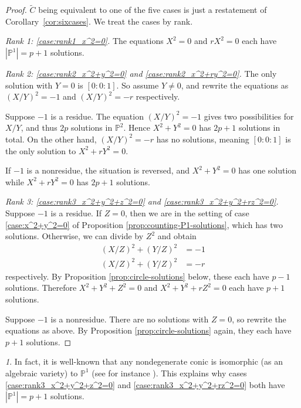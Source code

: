 \documentclass[10pt,a4paper]{amsart}
\numberwithin{equation}{section}
\numberwithin{figure}{section}
\numberwithin{table}{section}
\theoremstyle{definition}
\theoremstyle{plain}
\theoremstyle{remark}
\newtheorem*{rem*}{\protect\remarkname}
\theoremstyle{plain}
\theoremstyle{definition}
\theoremstyle{plain}
\theoremstyle{plain}
\providecommand{\remarkname}{Remark}
\renewcommand{\P}{\mathbb{P}}
\begin{document}
	\begin{proof}
		$\widetilde{C}$ being equivalent to one of the five cases is just a restatement of Corollary~\ref{cor:sixcases}. We treat the cases by rank.
		
		\noindent
		\textit{Rank 1: \eqref{case:rank1_x^2=0}.} 
		The equations $X^2 = 0$ and $rX^2 = 0$ each have $|\P^1|=p + 1$ solutions.
		
		\noindent
		\textit{Rank 2: \eqref{case:rank2_x^2+y^2=0} and \eqref{case:rank2_x^2+ry^2=0}.} 
		The only solution with $Y=0$ is $[0:0:1]$. So assume $Y \neq 0$, and rewrite the 
		equations as $(X/Y)^2 = -1$ and $(X/Y)^2 = -r$ respectively.
		
		Suppose $-1$ is a residue. The equation $(X/Y)^2 = -1$ gives
		two possibilities for $X/Y$, and thus $2p$ solutions in $\P^2$. Hence
		$X^2 + Y^2 = 0$ has $2p + 1$ solutions in total. On the other hand, $(X/Y)^2 =
		-r$ has no solutions, meaning $[0:0:1]$ is the only solution to $X^2 + rY^2 =
		0$.
		
		If $-1$ is a nonresidue, the situation is reversed, and $X^2 + Y^2 = 0$ has one
		solution while $X^2 + rY^2 = 0$ has $2p + 1$ solutions.
		
		\noindent
		\textit{Rank 3: \eqref{case:rank3_x^2+y^2+z^2=0} and \eqref{case:rank3_x^2+y^2+rz^2=0}.} 
		Suppose $-1$ is a residue. If $Z = 0$, then we are in the setting of case \eqref{case:x^2+y^2=0} of
		Proposition \ref{prop:counting-P1-solutions}, which has two
		solutions. Otherwise, we can divide by $Z^2$ and obtain 
		\begin{align*} 
		(X/Z)^2 + (Y/Z)^2 &= -1 \\ 
		(X/Z)^2 + (Y/Z)^2 &= -r 
		\end{align*} 
		respectively. By Proposition \ref{prop:circle-solutions} below, these each have $p - 1$
		solutions. Therefore $X^2 + Y^2 + Z^2 = 0$ and $X^2 + Y^2 + rZ^2 = 0$ each have
		$p+1$ solutions.
		
		Suppose $-1$ is a nonresidue. There are no solutions with $Z=0$, so rewrite the
		equations as above. By Proposition \ref{prop:circle-solutions} again, they each
		have $p + 1$ solutions.
	\end{proof}
	
	\begin{rem*}
		In fact, it is well-known that any nondegenerate conic is isomorphic (as an algebraic variety) to $\P^1$ (see for instance \cite[Prop.~19.3.1]{vakil}). This explains why cases \eqref{case:rank3_x^2+y^2+z^2=0} and \eqref{case:rank3_x^2+y^2+rz^2=0} both have $|\P^1|=p+1$ solutions.
	\end{rem*}
	
\end{document}
